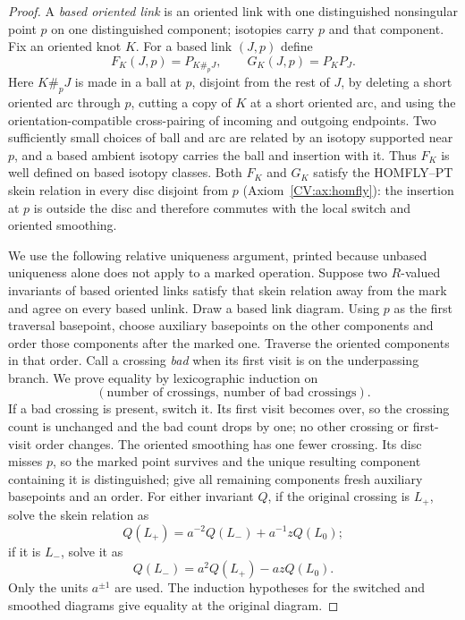 \begin{proof}\leanok{}
A \emph{based oriented link} is an oriented link with one distinguished
nonsingular point $p$ on one distinguished component; isotopies carry $p$ and
that component. Fix an oriented knot $K$. For a based link $(J,p)$ define
\[
   F_K(J,p)=P_{K\#_pJ},\qquad G_K(J,p)=P_KP_J.
\]
Here $K\#_pJ$ is made in a ball at $p$, disjoint from the rest of $J$, by
deleting a short oriented arc through $p$, cutting a copy of $K$ at a short
oriented arc, and using the orientation-compatible cross-pairing of incoming
and outgoing endpoints. Two sufficiently small choices of ball and arc are
related by an isotopy supported near $p$, and a based ambient isotopy carries
the ball and insertion with it. Thus $F_K$ is well defined on based isotopy
classes. Both $F_K$ and $G_K$ satisfy the HOMFLY--PT skein relation in every
disc disjoint from $p$ (Axiom~\ref{CV:ax:homfly}): the insertion at $p$ is outside
the disc and therefore commutes with the local switch and oriented smoothing.

We use the following relative uniqueness argument, printed because unbased
uniqueness alone does not apply to a marked operation. Suppose two $R$-valued
invariants of based oriented links satisfy that skein relation away from the
mark and agree on every based unlink. Draw a based link diagram. Using $p$ as
the first traversal basepoint, choose auxiliary basepoints on the other
components and order those components after the marked one. Traverse the
oriented components in that order. Call a crossing \emph{bad} when its first
visit is on the underpassing branch. We prove equality by lexicographic
induction on
\[
   (\text{number of crossings},\ \text{number of bad crossings}).
\]
If a bad crossing is present, switch it. Its first visit becomes over, so the
crossing count is unchanged and the bad count drops by one; no other crossing
or first-visit order changes. The oriented smoothing has one fewer crossing.
Its disc misses $p$, so the marked point survives and the unique resulting
component containing it is distinguished; give all remaining components fresh
auxiliary basepoints and an order. For either invariant $Q$, if the original
crossing is $L_+$, solve the skein relation as
\[
   Q(L_+)=a^{-2}Q(L_-)+a^{-1}zQ(L_0);
\]
if it is $L_-$, solve it as
\[
   Q(L_-)=a^2Q(L_+)-azQ(L_0).
\]
Only the units $a^{\pm1}$ are used. The induction hypotheses for the switched
and smoothed diagrams give equality at the original diagram.


\end{proof}
